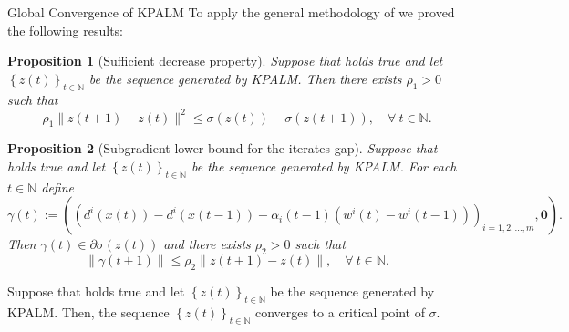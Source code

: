 \documentclass[9pt,handout]{beamer} %
\newtheorem{proposition}{Proposition}
\newcommand{\nn}{\mathbb{N}} %
\begin{document}
	\begin{frame}{Global Convergence of KPALM}
		To apply the general methodology of {\dblue [BST]} we proved the following results:
		\pause
		\begin{proposition}[Sufficient decrease property]
			Suppose that  holds true and let $\left\lbrace z(t) \right\rbrace_{t \in \nn}$ be the sequence generated by KPALM. Then there exists $\rho_1 > 0$ such that 
			\begin{equation*}
				\rho_1 \|z(t+1) - z(t)\|^2 \leq \sigma(z(t)) - \sigma(z(t+1)), \quad \forall \: t \in \mathbb{N} .
			\end{equation*}
		\end{proposition}
		\pause
		\begin{proposition}[Subgradient lower bound for the iterates gap]
			Suppose that  holds true and let $\left\lbrace z(t) \right\rbrace_{t \in \mathbb{N}}$ be the sequence generated by KPALM.
			For each $t \in \nn$ define 
			\begin{equation*}
				\gamma(t) := \left( \left( d^i(x(t)) - d^i(x(t-1)) - \alpha_i(t-1)(w^i(t) - w^i(t-1)) \right)_{i=1,2, \ldots, m}, \mathbf{0} \right).
			\end{equation*}
			Then $\gamma(t) \in \partial \sigma(z(t))$ and there exists $\rho_2 > 0$ such that 
			\begin{equation*}
				\| \gamma(t+1)\| \leq \rho_2 \|z(t+1) - z(t)\|, \quad \forall \: t \in \mathbb{N} .
			\end{equation*}
		\end{proposition}
		\pause
		\begin{theorem}
			Suppose that  holds true and let $\left\lbrace z(t) \right\rbrace_{t \in \nn}$ be the sequence generated by KPALM. Then, the sequence $\left\lbrace z(t) \right\rbrace_{t \in \nn}$ converges to a critical point of $\sigma$.
		\end{theorem}
	\end{frame}	
	
\end{document}
